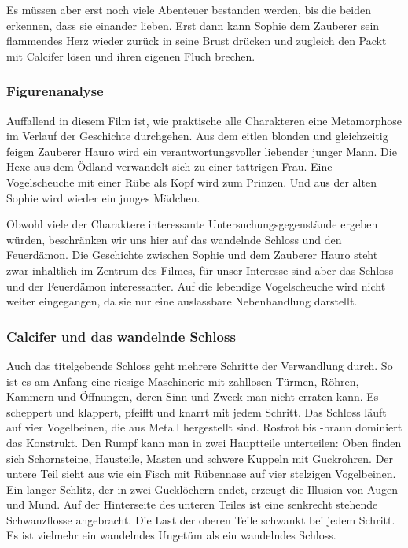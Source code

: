 Es müssen aber erst noch viele Abenteuer bestanden werden, bis die beiden erkennen, dass sie einander lieben. Erst dann kann Sophie dem Zauberer sein flammendes Herz wieder zurück in seine Brust drücken und zugleich den Packt mit Calcifer lösen und ihren eigenen Fluch brechen. 

\subsubsection{Figurenanalyse} 
Auffallend in diesem Film ist, wie praktische alle Charakteren eine Metamorphose im Verlauf der Geschichte durchgehen. Aus dem eitlen blonden und gleichzeitig feigen Zauberer Hauro wird ein verantwortungsvoller liebender junger Mann. Die Hexe aus dem Ödland verwandelt sich zu einer tattrigen Frau. Eine Vogelscheuche mit einer Rübe als Kopf wird zum Prinzen. Und aus der alten Sophie wird wieder ein junges Mädchen.  

Obwohl viele der Charaktere interessante Untersuchungsgegenstände ergeben würden, beschränken wir uns hier auf das wandelnde Schloss und den Feuerdämon. Die Geschichte zwischen Sophie und dem Zauberer Hauro steht zwar inhaltlich im Zentrum des Filmes, für unser Interesse sind aber das Schloss und der Feuerdämon interessanter. Auf die lebendige Vogelscheuche wird nicht weiter eingegangen, da sie nur eine auslassbare Nebenhandlung darstellt. 

\subsubsection*{Calcifer und das wandelnde Schloss} 
Auch das titelgebende Schloss geht mehrere Schritte der Verwandlung durch. So ist es am Anfang eine riesige Maschinerie mit zahllosen Türmen, Röhren, Kammern und Öffnungen, deren Sinn und Zweck man nicht erraten kann. Es scheppert und klappert, pfeifft und knarrt mit jedem Schritt. Das Schloss läuft auf vier Vogelbeinen, die aus Metall hergestellt sind. Rostrot bis -braun dominiert das Konstrukt. Den Rumpf kann man in zwei Hauptteile unterteilen: Oben finden sich Schornsteine, Hausteile, Masten und schwere Kuppeln mit Guckrohren. Der untere Teil sieht aus wie ein Fisch mit Rübennase auf vier stelzigen Vogelbeinen. Ein langer Schlitz, der in zwei Gucklöchern endet, erzeugt die Illusion von Augen und Mund. Auf der Hinterseite des unteren Teiles ist eine senkrecht stehende Schwanzflosse angebracht. Die Last der oberen Teile schwankt bei jedem Schritt. Es ist vielmehr ein wandelndes Ungetüm als ein wandelndes Schloss. 

